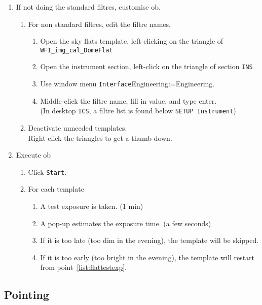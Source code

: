\documentclass[11pt,fleqn,a4paper]{book}
\makeatletter
\def\menu#1#2{\texttt{#1}\ifx{}#2\else\@for\@x:=#2\do{$\rightarrow$\texttt{\@x}}\fi}
\def\wmenu#1#2{window menu \menu{#1}{#2}}
\makeatother
\begin{document}
\begin{enumerate}
  \item If not doing the standard filtres, customise \gls{ob}.
    \begin{enumerate}
       \item For non standard filtres, edit the filtre names.
             \label{list:editfilt} 
              \begin{enumerate}
                 \item Open the \gls{sky flats} \gls{template}, left-clicking on the triangle of \texttt{WFI\_img\_cal\_DomeFlat}
                 \item Open the instrument section, left-click on the triangle of section \texttt{INS}
                 \item Use \wmenu{Interface}{Engineering}.
                 \item Middle-click the filtre name, fill in value, and type enter.\\
                      (In \gls{desktop} \texttt{ICS}, a filtre list is found below \texttt{SETUP Instrument})
              \end{enumerate}
       \item Deactivate unneeded \gls{template}s.\\
             Right-click the triangles to get a thumb down.
    \end{enumerate}
  \item Execute \gls{ob}
    \begin{enumerate}
      \item Click \texttt{Start}.
      \item For each \gls{template}
       \begin{enumerate}
         \item \label{list:flattestexp}A test exposure is taken. (1 min)
         \item A pop-up estimates the exposure time. (a few seconds)
         \item If it is too late (too dim in the evening), the \gls{template} will be skipped.
         \item If it is too early (too bright in the evening), the \gls{template} will restart from point~\ref{list:flattestexp}.
       \end{enumerate}
    \end{enumerate}
\end{enumerate}


\subsection{Pointing} 
\end{document}
